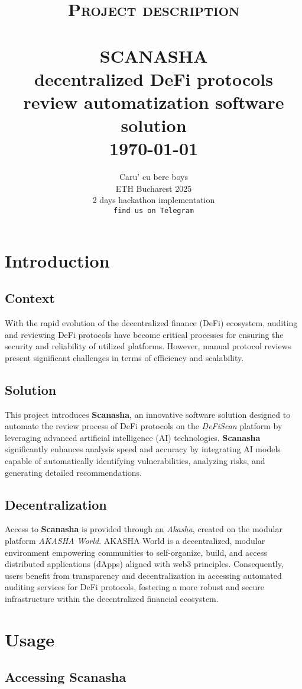 \documentclass[paper=a4, fontsize=11pt,twoside]{scrartcl}
\title{	\normalsize \textsc{Project description}
\\[2.0cm]
\HRule{0.5pt} \\
\LARGE \textbf{\uppercase{Scanasha} \\ \vspace{0.1cm} decentralized DeFi protocols review automatization software solution}
\HRule{2pt} \\ [0.5cm]
\normalsize \today
}
\author{
	Caru' cu bere boys \\
	ETH Bucharest 2025\\
	2 days hackathon implementation\\
	\texttt{find us on Telegram} \\
}
\makeatletter
\def\printtitle{%
		{\centering \@title\par}}
\def\printauthor{%
		{\centering \large \@author}}
\makeatother
\begin{document}
	\thispagestyle{empty}
	\printtitle
	\vfill
	\printauthor
	\newpage

	\setcounter{page}{1}
	\section{Introduction}

	\subsection{Context}
	With the rapid evolution of the decentralized finance (DeFi) ecosystem, auditing and reviewing DeFi protocols have become critical processes for ensuring the security and reliability of utilized platforms. However, manual protocol reviews present significant challenges in terms of efficiency and scalability.

	\subsection{Solution}
	This project introduces \textbf{Scanasha}, an innovative software solution designed to automate the review process of DeFi protocols on the \textit{DeFiScan} platform by leveraging advanced artificial intelligence (AI) technologies. \textbf{Scanasha} significantly enhances analysis speed and accuracy by integrating AI models capable of automatically identifying vulnerabilities, analyzing risks, and generating detailed recommendations.

	\subsection{Decentralization}
	Access to \textbf{Scanasha} is provided through an \textit{Akasha}, created on the modular platform \textit{AKASHA World}. AKASHA World is a decentralized, modular environment empowering communities to self-organize, build, and access distributed applications (dApps) aligned with web3 principles. Consequently, users benefit from transparency and decentralization in accessing automated auditing services for DeFi protocols, fostering a more robust and secure infrastructure within the decentralized financial ecosystem.

	\section{Usage}

	\subsection{Accessing Scanasha}
\end{document}
